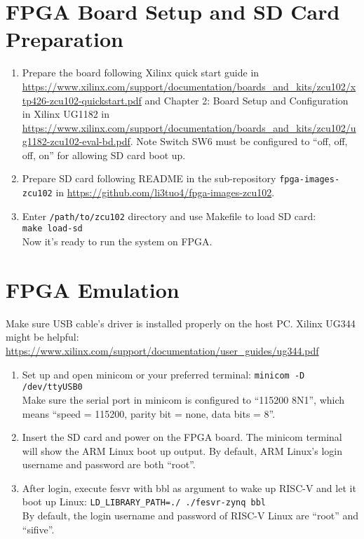\documentclass[a4paper,11pt]{article}
\begin{document}
\section{FPGA Board Setup and SD Card Preparation}
\begin{enumerate}
\item Prepare the board following Xilinx quick start guide in \url{https://www.xilinx.com/support/documentation/boards_and_kits/zcu102/xtp426-zcu102-quickstart.pdf} and Chapter 2: Board Setup and Configuration in Xilinx UG1182 in \url{https://www.xilinx.com/support/documentation/boards_and_kits/zcu102/ug1182-zcu102-eval-bd.pdf}. Note Switch SW6 must be configured to ``off, off, off, on'' for allowing SD card boot up.
\item Prepare SD card following README in the sub-repository {\tt fpga-images-zcu102} in \url{https://github.com/li3tuo4/fpga-images-zcu102}.
\item Enter {\tt /path/to/zcu102} directory and use Makefile to load SD card:\\
{\tt make load-sd}\\
Now it's ready to run the system on FPGA.
\end{enumerate}

\section{FPGA Emulation}
Make sure USB cable's driver is installed properly on the host PC. Xilinx UG344 might be helpful: \url{https://www.xilinx.com/support/documentation/user_guides/ug344.pdf}
\begin{enumerate}
\item Set up and open minicom or your preferred terminal:
{\tt minicom -D /dev/ttyUSB0}\\
Make sure the serial port in minicom is configured to ``115200 8N1'', which means ``speed = 115200, parity bit = none, data bits = 8''.

\item Insert the SD card and power on the FPGA board. The minicom terminal will show the ARM Linux boot up output. By default, ARM Linux's login username and password are both ``root''.

\item After login, execute fesvr with bbl as argument to wake up RISC-V and let it boot up Linux:
{\tt LD\_LIBRARY\_PATH=./ ./fesvr-zynq bbl}\\
By default, the login username and password of RISC-V Linux are ``root'' and ``sifive''.
\end{enumerate}
\end{document}
